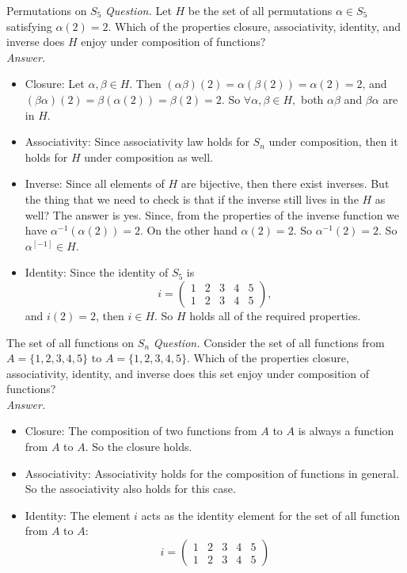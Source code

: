 \begin{example}{Permutations on $S_5$}
	\textit{Question.} Let $H$ be the set of all permutations $\alpha \in S_5$ satisfying $\alpha(2)=2$. Which of the properties closure, associativity, identity, and inverse does $H$ enjoy under composition of functions? \\
	
	\textit{Answer.} 
	\begin{itemize}
		\item Closure: Let $\alpha, \beta \in H$. Then $(\alpha \beta)(2) = \alpha(\beta(2)) = \alpha(2) = 2$, and $(\beta \alpha) (2) = \beta(\alpha(2)) = \beta (2) = 2$. So $\forall \alpha, \beta \in H,$ both $\alpha\beta$ and $\beta\alpha$ are in $H$.
		\item Associativity: Since associativity law holds for $S_n$ under composition, then it holds for $H$ under composition as well.
		\item Inverse: Since all elements of $H$ are bijective, then there exist inverses. But the thing that we need to check is that if the inverse still lives in the $H$ as well? The answer is yes. Since, from the properties of the inverse function we have $\alpha^{-1} (\alpha(2))=2$. On the other hand $\alpha(2)=2$. So $\alpha^{-1}(2) = 2$. So $\alpha^[-1] \in H$.
		\item Identity: Since the identity of $S_5$ is \[ i = \begin{pmatrix} 1 & 2 & 3 & 4 & 5 \\ 1 & 2 & 3 & 4 & 5 \end{pmatrix}, \] and $i(2)=2$, then $i \in H$.
		So $H$ holds all of the required properties.
	\end{itemize}
\end{example}

\begin{example}{The set of all functions on $S_n$}
	\textit{Question.} Consider the set of all functions from $A = \{1,2,3,4,5\}$ to $A = \{1,2,3,4,5\}$. Which of the properties closure, associativity, identity, and inverse does this set enjoy under composition of functions?\\
	
	\textit{Answer.}
	\begin{itemize}
		\item Closure: The composition of two functions from $A$ to $A$ is always a function from $A$ to $A$. So the closure holds.
		\item Associativity: Associativity holds for the composition of functions in general. So the associativity also holds for this case.
		\item Identity: The element $i$ acts as the identity element for the set of all function from $A$ to $A$:  \[ i = \begin{pmatrix} 1 & 2 & 3 & 4 & 5 \\ 1 & 2 & 3 & 4 & 5 \end{pmatrix} \]
	\end{itemize}
\end{example}
